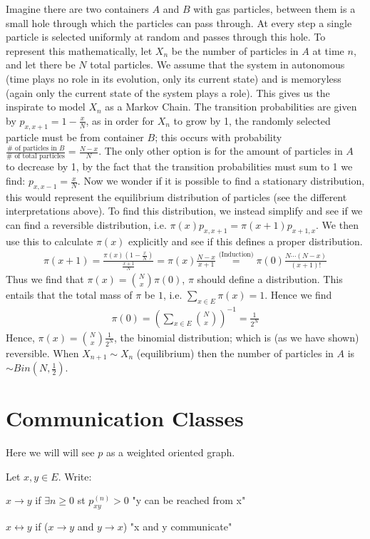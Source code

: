\begin{ex}
	Imagine there are two containers $A$ and $B$ with gas particles, between them is a small hole through which the particles can pass through. At every step a single particle is selected uniformly at random and passes through this hole. To represent this mathematically, let $X_n$ be the number of particles in $A$ at time $n$, and let there be $N$ total particles. We assume that the system in autonomous (time plays no role in its evolution, only its current state) and is memoryless (again only the current state of the system plays a role). This gives us the inspirate to model $X_n$ as a Markov Chain. The transition probabilities are given by $p_{x, x+1}= 1- \frac{x}{N}$, as in order for $X_n$ to grow by 1, the randomly selected particle must be from container $B $; this occurs with probability $\frac{\# \textrm{ of particles in }B}{\# \textrm{ of total particles}} = \frac{N-x}{N}$. The only other option is for the amount of particles in $A$ to decrease by 1, by the fact that the transition probabilities must sum to 1 we find: $p_{x, x-1}= \frac{x}{N}$. Now we wonder if it is possible to find a stationary distribution, this would represent the equilibrium distribution of particles (see the different interpretations above). To find this distribution, we instead simplify and see if we can find a reversible distribution, i.e. $\pi (x) p_{x,x+1} = \pi (x+1)p_{x+1, x}$. We then use this to calculate $\pi (x)$ explicitly and see if this defines a proper distribution. 
	\begin{align}
		\pi (x+1) = \frac{\pi (x)(1 - \frac{x}{N})}{\frac{x+1}{N}} = \pi (x) \frac{N-x}{x+1} \stackrel{\textrm{(Induction)}}{=} \pi (0) \frac{N  \cdots (N-x)}{(x+1)!} 
	\end{align}
	Thus we find that $\pi (x) = \binom{N}{x}\pi(0)$, $\pi$ should define a distribution. This entails that the total mass of $\pi $ be $1$, i.e. $\sum_{x \in E}^{} \pi (x)=1$. Hence we find 
\begin{align}
\pi (0) = \left( \sum_{x \in E}^{} \binom{N}{x} \right)^{-1} = \frac{1}{2^N} 
\end{align}	
Hence, $\pi (x)= \binom{N}{x} \frac{1}{2^N}$, the binomial distribution; which is (as we have shown) reversible. When $X_{n+1} \sim X_n$ (equilibrium) then the number of particles in $A$ is $\sim Bin(N, \frac{1}{2})$.
\end{ex}


\section{Communication Classes}
Here we will will see $p$ as a weighted oriented graph.
\begin{defn}
	Let $x,y \in E$. Write:
\itemize
\item $x \to y$ if $\exists  n \geq 0$ st $p_{xy}^{(n)}> 0$ "y can be reached from x"
\item $x \leftrightarrow y$ if ($x \to y$ and  $y\to x $) "x and y communicate"
\end{defn}

